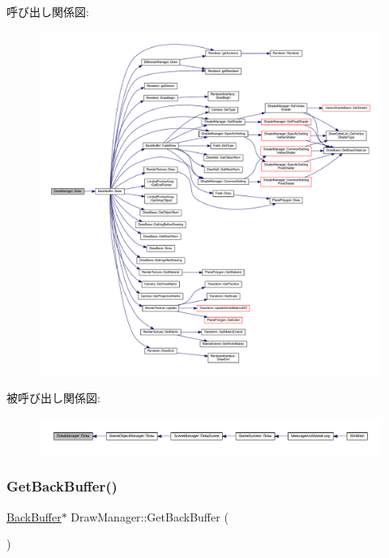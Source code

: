 呼び出し関係図\+:
\nopagebreak
\begin{figure}[H]
\begin{center}
\leavevmode
\includegraphics[width=350pt]{class_draw_manager_a43372495e68d77a2698f211cf921b37e_cgraph}
\end{center}
\end{figure}
被呼び出し関係図\+:
\nopagebreak
\begin{figure}[H]
\begin{center}
\leavevmode
\includegraphics[width=350pt]{class_draw_manager_a43372495e68d77a2698f211cf921b37e_icgraph}
\end{center}
\end{figure}
\mbox{\label{class_draw_manager_a0e7e11e650f1c1736e9d3199a58191a7}} 
\subsubsection{\texorpdfstring{Get\+Back\+Buffer()}{GetBackBuffer()}}
{\footnotesize\ttfamily \mbox{\hyperlink{class_back_buffer}{Back\+Buffer}}$\ast$ Draw\+Manager\+::\+Get\+Back\+Buffer (\begin{DoxyParamCaption}{ }\end{DoxyParamCaption})\hspace{0.3cm}{\ttfamily [inline]}}



